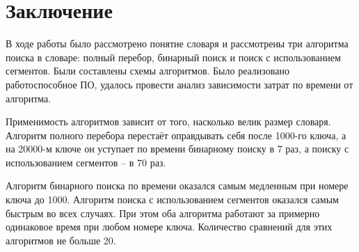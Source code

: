 \chapter{Заключение}
В ходе работы было рассмотрено понятие словаря и рассмотрены три алгоритма поиска в словаре: 
полный перебор, бинарный поиск и поиск с использованием сегментов.
Были составлены схемы алгоритмов.
Было реализовано работоспособное ПО, удалось провести анализ зависимости затрат по времени от алгоритма.

Применимость алгоритмов зависит от того, насколько велик размер словаря.
Алгоритм полного перебора перестаёт оправдывать себя после 1000-го ключа, а на 20000-м ключе
он уступает по времени бинарному поиску в 7 раз, а поиску с использованием сегментов -- в 70 раз.

Алгоритм бинарного поиска по времени оказался самым медленным при номере ключа до 1000.
Алгоритм поиска с использованием сегментов оказался самым быстрым во всех случаях.
При этом оба алгоритма работают за примерно одинаковое время при любом номере ключа.
Количество сравнений для этих алгоритмов не больше 20.